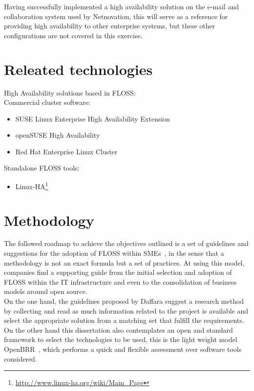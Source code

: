 \documentclass[a4paper, 12pt]{book}
\begin{document}
\noindent Having successfully implemented a high availability solution on the e-mail and collaboration system used by Netnovation, this will serve as a reference for providing high availability to other enterprise systems, but these other configurations are not covered in this exercise.\\


%
\chapter{Releated technologies}
\label{chap:related}

High Availability solutions based in FLOSS:\\

\noindent Commercial cluster software:
\begin{itemize}
	\item SUSE Linux Enterprise High Availability Extension
	\item openSUSE High Availability
	\item Red Hat Enterprise Linux Cluster
\end{itemize}

\noindent Standalone FLOSS tools:
\begin{itemize}
	\item Linux-HA\footnote{\url{http://www.linux-ha.org/wiki/Main_Page}}
\end{itemize}


%
\chapter{Methodology}
\label{chap:methodology}

The followed roadmap to achieve the objectives outlined is a set of guidelines and suggestions for the adoption of FLOSS within SMEs~\cite{Daffara1}, in the sense that a methodology is not an exact formula but a set of practices. At using this model, companies find a supporting guide from the initial selection and adoption of FLOSS within the IT infrastructure and even to the consolidation of business models around open source.\\

\noindent On the one hand, the guidelines proposed by Daffara suggest a research method by collecting and read as much information related to the project is available and select the appropriate solution from a matching set that fulfill the requirements. On the other hand this dissertation also contemplates an open and standard framework to select the technologies to be used, this is the light weight model OpenBRR~\cite{Wasserman et. all}, which performs a quick and flexible assessment over software tools considered.\\
\end{document}
